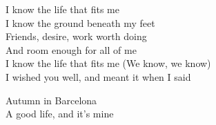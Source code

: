 \begin{lyrics}

I know the life that fits me\\
I know the ground beneath my feet\\
Friends, desire, work worth doing\\
And room enough for all of me\\
I know the life that fits me
(We know, we know)\\
I wished you well, and meant it when I said

Autumn in Barcelona\\
A good life, and it’s mine
\end{lyrics}

